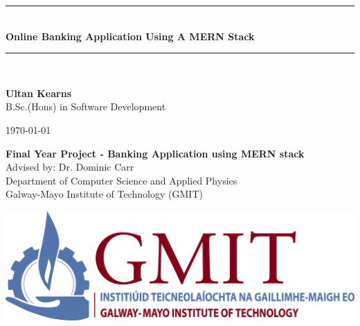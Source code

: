 \documentclass[12pt,a4paper,oneside,openany]{book}
\newcommand{\projecttitle}{Online Banking Application Using A MERN Stack}
\newcommand{\projectauthor}{Ultan Kearns}
\newcommand{\projectadvisor}{Dr. Dominic Carr}
\newcommand{\projectprogramme}{B.Sc.(Hons) in Software Development}
\newcommand{\projectdate}{\today}
\begin{document}
  \begin{titlepage}
    \begin{minipage}[t][6cm]{\textwidth}
      \centering
      \rule{\linewidth}{0.5mm} \\[0.4cm]
      { \LARGE \bfseries \projecttitle \\[0.4cm] }
      \rule{\linewidth}{0.5mm} \\[0.8cm]
    \end{minipage}

    \begin{minipage}[t][6.5cm]{\textwidth}
      \centering
      \textbf{\projectauthor}\\[0.5cm]
      \projectprogramme
    \end{minipage}

    \begin{minipage}[t][1cm]{\textwidth}
      \centering
      \textsc{\projectdate}
    \end{minipage}

    \begin{minipage}[t][3cm]{\textwidth}
      \centering
      \textbf{Final Year Project - Banking Application using MERN stack}\\[0.3cm]
      Advised by: \projectadvisor \\[0.1cm]
      Department of Computer Science and Applied Physics\\
      Galway-Mayo Institute of Technology (GMIT)
     \end{minipage}
    \begin{center}
    \includegraphics{img/gmit-logo.jpg}
    \end{center}
  \end{titlepage}
  \setcounter{page}{2}
  \tableofcontents
  \listoffigures
  
\end{document}
